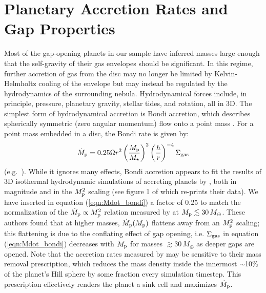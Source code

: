 \documentclass[fleqn,usenatbib]{mnras}
\newcommand{\Mstar}{M_{\star}}
\newcommand{\Sigg}{\Sigma_{\rm gas}}
\begin{document}
\section{Planetary Accretion Rates and \\Gap Properties}
\label{sec:results}
Most of the gap-opening planets in our sample 
have inferred masses large enough 
that the self-gravity of their
gas envelopes should be significant.
In this regime, further accretion of gas 
from the disc may no longer be limited by
Kelvin-Helmholtz cooling of the
envelope but may instead be regulated by the hydrodynamics
of the surrounding nebula. 
Hydrodynamical forces include, in principle, pressure, planetary gravity, stellar tides, and rotation, all in 3D. The simplest 
form of hydrodynamical accretion is Bondi accretion,
which describes spherically symmetric 
(zero angular momentum) flow onto a point mass  \citep[e.g.][]{frank_king_raine}. For a point mass
embedded in a disc, the Bondi rate is given by:
\begin{align}
    \dot{M}_{\rm p} = 0.25 \Omega r^2 \left(\frac{M_{\rm p}}{\Mstar}\right)^2\left(\frac{h}{r}\right)^{-4}\Sigg %
    \label{eqn:Mdot_bondi}
\end{align}
(e.g.~\citealt{ginzburg_chiang_2019a}). 
While it ignores many effects, Bondi accretion appears to fit
the results of 3D isothermal hydrodynamic simulations
of accreting planets
by \cite{dangelo_etal_2003},
both in magnitude and in the $M_{\rm p}^2$
scaling (see figure 1 of \citealt{tanigawa_tanaka_2016} which re-prints their data). We have inserted in equation (\ref{eqn:Mdot_bondi}) a factor of 0.25 to match the normalization of the $\dot{M}_{\rm p} \propto M_{\rm p}^2$
relation measured by \cite{dangelo_etal_2003} at $M_{\rm p} \lesssim 30 \,M_\oplus$.
These authors found that at higher masses, $\dot{M}_{\rm p} (M_{\rm p})$ flattens away from an $M_{\rm p}^2$ scaling; this flattening is due to the conflating effect of gap opening, i.e. $\Sigma_{\rm gas}$ in equation (\ref{eqn:Mdot_bondi}) decreases with $M_{\rm p}$ for masses $\gtrsim 30\, M_\oplus$ as deeper gaps are opened.
Note that the accretion rates measured by \citet{dangelo_etal_2003} may be sensitive to their mass removal prescription, which reduces the mass density inside the innermost $\sim$10\% of the planet's Hill sphere by some fraction every simulation timestep. This prescription effectively renders the planet a sink cell and 
maximizes $\dot{M}_{\rm p}$.
\end{document}
